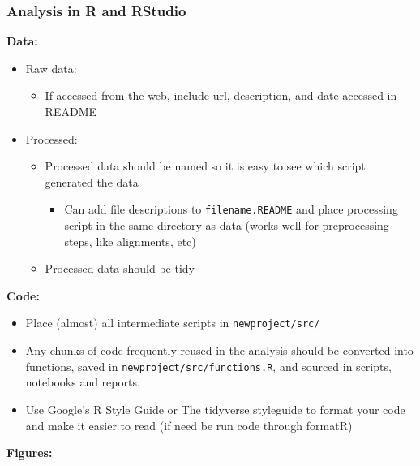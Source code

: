 \documentclass[openany]{article}
\providecommand{\tightlist}{%
  \setlength{\itemsep}{0pt}\setlength{\parskip}{0pt}}
\begin{document}
\hypertarget{analysis-in-r-and-rstudio}{%
\subsubsection{Analysis in R and RStudio}\label{analysis-in-r-and-rstudio}}

\textbf{Data:}

\begin{itemize}
\tightlist
\item
  Raw data:

  \begin{itemize}
  \tightlist
  \item
    If accessed from the web, include url, description, and date accessed in README
  \end{itemize}
\item
  Processed:

  \begin{itemize}
  \tightlist
  \item
    Processed data should be named so it is easy to see which script generated the data

    \begin{itemize}
    \tightlist
    \item
      Can add file descriptions to \texttt{filename.README} and place processing script in the same directory as data (works well for preprocessing steps, like alignments, etc)
    \end{itemize}
  \item
    Processed data should be tidy
  \end{itemize}
\end{itemize}

\textbf{Code:}

\begin{itemize}
\tightlist
\item
  Place (almost) all intermediate scripts in \texttt{newproject/src/}
\item
  Any chunks of code frequently reused in the analysis should be converted into functions, saved in \texttt{newproject/src/functions.R}, and sourced in scripts, notebooks and reports.\\
\item
  Use Google's R Style Guide or The tidyverse styleguide to format your code and make it easier to read (if need be run code through formatR)
\end{itemize}

\textbf{Figures:}
\end{document}
